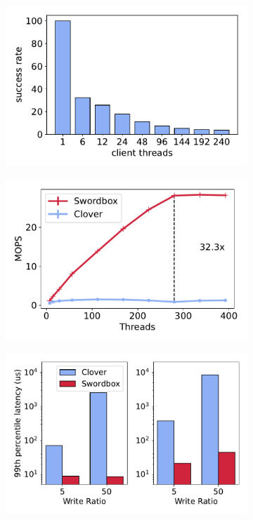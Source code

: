 \begin{figure}[t!]
    \begin{subfigure}{.33\textwidth}
      \centering
      \includegraphics[width=.9\linewidth]{fig/success_rate.pdf}
    \end{subfigure}%
    \begin{subfigure}{.33\textwidth}
      \centering
      \includegraphics[width=.9\linewidth]{fig/full_system_performance.pdf}
    \end{subfigure}
    \begin{subfigure}{.33\textwidth}
      \centering
      \includegraphics[width=.9\linewidth]{fig/99th_latency.pdf}
    \end{subfigure}


\end{figure}
